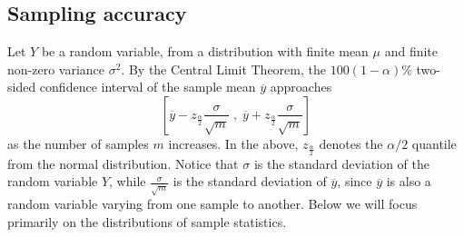 \documentclass[a4paper,11pt]{article}
\newcommand{\alex}[1]{{\color{blue}{#1}}}
\begin{document}










\subsection{Sampling accuracy\label{sec:sampling-accuracy}}

Let $Y$ be a random variable, from a distribution with finite mean $\mu$ and finite non-zero variance $\sigma^2$. By the Central Limit Theorem, the $100(1-\alpha)\%$ two-sided confidence interval of the sample mean $\overline{y}$ approaches 
\[\left[\overline{y} - z_{\frac{\alpha}{2}}\frac{\sigma}{\sqrt{m}} \;, \; \overline{y} + z_{\frac{\alpha}{2}}\frac{\sigma}{\sqrt{m}}\right] \]
as the number of samples $m$ increases. In the above, $z_{\frac{\alpha}{2}}$ denotes the $\alpha/2$ quantile from the normal distribution. Notice that $\sigma$ is the standard deviation of the random variable $Y$, while $\frac{\sigma}{\sqrt{m}}$ is the standard deviation of $\overline{y}$, since $\overline{y}$ is also a random variable varying from one sample to another. Below we will focus primarily on the distributions of sample statistics.
\end{document}
